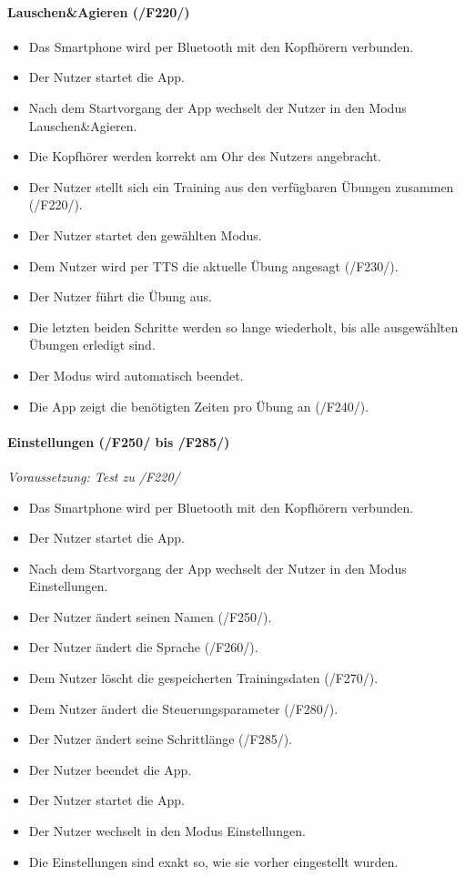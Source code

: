 \documentclass[a4paper,12pt]{article}
\begin{document}
      \paragraph{Lauschen\&Agieren (/F220/)}
      \begin{itemize}
        \item[] Das Smartphone wird per Bluetooth mit den Kopfhörern verbunden.
        \item[] Der Nutzer startet die App.
        \item[] Nach dem Startvorgang der App wechselt der Nutzer in den Modus \glqq Lauschen\&Agieren\grqq .
        \item[] Die Kopfhörer werden korrekt am Ohr des Nutzers angebracht.
        \item[] Der Nutzer stellt sich ein Training aus den verfügbaren Übungen zusammen (/F220/).
        \item[] Der Nutzer startet den gewählten Modus.
        \item[] Dem Nutzer wird per \Gls{TTS} die aktuelle Übung angesagt (/F230/).
        \item[] Der Nutzer führt die Übung aus.
        \item[] Die letzten beiden Schritte werden so lange wiederholt, bis alle ausgewählten Übungen erledigt sind.
        \item[] Der Modus wird automatisch beendet.
        \item[] Die App zeigt die benötigten Zeiten pro Übung an (/F240/).
      \end{itemize}

      \paragraph{Einstellungen (/F250/ bis /F285/)}
      \textit{Voraussetzung: Test zu /F220/}
      \begin{itemize}
        \item[] Das Smartphone wird per Bluetooth mit den Kopfhörern verbunden.
        \item[] Der Nutzer startet die App.
        \item[] Nach dem Startvorgang der App wechselt der Nutzer in den Modus \glqq Einstellungen\grqq .
        \item[] Der Nutzer ändert seinen Namen (/F250/).
        \item[] Der Nutzer ändert die Sprache (/F260/).
        \item[] Dem Nutzer löscht die gespeicherten Trainingsdaten (/F270/).
        \item[] Dem Nutzer ändert die Steuerungsparameter (/F280/).
        \item[] Der Nutzer ändert seine Schrittlänge (/F285/).
        \item[] Der Nutzer beendet die App.
        \item[] Der Nutzer startet die App.
        \item[] Der Nutzer wechselt in den Modus \glqq Einstellungen\grqq .
        \item[] Die Einstellungen sind exakt so, wie sie vorher eingestellt wurden.
      \end{itemize}
\end{document}

